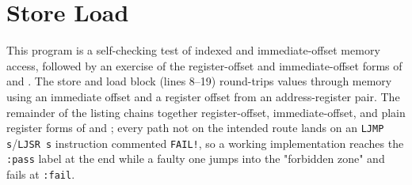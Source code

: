 \label{ex:software-exception}


\section{Store Load}

This program is a self-checking test of indexed and immediate-offset memory access, followed by an exercise of the
register-offset and immediate-offset forms of  and . The store and load block (lines
8--19) round-trips values through memory using an immediate offset and a register offset from an address-register pair.
The remainder of the listing chains together register-offset, immediate-offset, and plain register forms of
 and ; every path not on the intended route lands on an \texttt{LJMP s}/\texttt{LJSR s}
instruction commented \texttt{FAIL!}, so a working implementation reaches the \texttt{:pass} label at the end while a
faulty one jumps into the "forbidden zone" and fails at \texttt{:fail}.

\label{ex:store-load}

